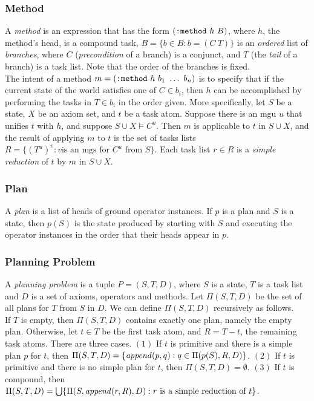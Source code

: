 \subsubsection{Method}
A \emph{method} is an expression that has the form $(\verb|:method|~h~B)$,
where $h$, the method's head, is a compound task, $B = \{b \in B:b = (C~T)\}$
is an \emph{ordered} list of \emph{branches}, where $C$ (\emph{precondition} of
a branch) is a conjunct, and $T$ (the \emph{tail} of a branch) is a task list.
Note that the order of the branches is fixed. \\
The intent of a method $m = (\verb|:method|~h~b_1~\dots~b_n)$ is to specify
that if the current state of the world satisfies one of $C \in b_i$, then $h$
can be accomplished by performing the tasks in $T \in b_i$ in the order given.
More specifically, let $S$ be a state, $X$ be an axiom set, and $t$ be a task
atom.  Suppose there is an mgu $u$ that unifies $t$ with $h$, and suppose $S
\cup X \vDash C^u$. Then $m$ is applicable to $t$ in $S \cup X$, and the result
of applying $m$ to $t$ is the set of tasks lists $R = \{(T^u)^v : \textrm{$v$
is an mgs for $C^u$ from $S$}\}$. Each task list $r \in R$ is a \emph{simple
reduction} of $t$ by $m$ in $S \cup X$.
\subsubsection{Plan}
A \emph{plan} is a list of heads of ground operator instances. If $p$ is a plan
and $S$ is a state, then $p(S)$ is the state produced by starting with $S$ and
executing the operator instances in the order that their heads appear in $p$.
\subsubsection{Planning Problem}
A \emph{planning problem} is a tuple $P = (S,T,D)$, where $S$ is a state, $T$
is a task list and $D$ is a set of axioms, operators and methods. Let
$\Pi(S,T,D)$ be the set of all plans for $T$ from $S$ in $D$. We can define
$\Pi(S,T,D)$ recursively as follows.\\ 
If $T$ is empty, then $\Pi(S,T,D)$ contains exactly one plan, namely the empty
plan. Otherwise, let $t \in T$ be the first task atom, and $R = T - t$, the
remaining task atoms. There are three cases.  $(1)$ If $t$ is primitive and
there is a simple plan $p$ for $t$, then $\Pi(S,T,D) =
\{\textrm{\emph{append}}(p,q) : q \in \Pi(p(S),R,D)\}$.  $(2)$ If $t$ is
primitive and there is no simple plan for $t$, then $\Pi(S,T,D) = \emptyset$.
$(3)$ If $t$ is compound, then $\Pi(S,T,D) =
\bigcup\{\Pi(S,\textrm{\emph{append}}(r,R),D) : \textrm{$r$ is a simple
reduction of $t$}\}$.

